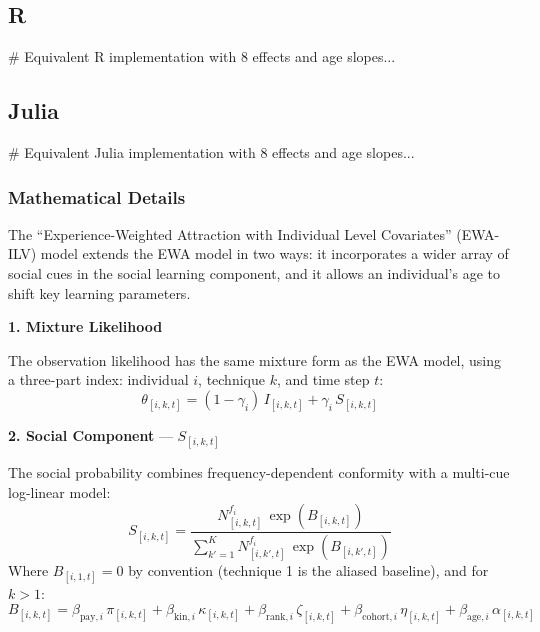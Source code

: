 \documentclass[
  letterpaper,
  DIV=11,
  numbers=noendperiod]{scrartcl}
\newenvironment{Shaded}{\begin{snugshade}}{\end{snugshade}}
\newcommand{\CommentTok}[1]{\textcolor[rgb]{0.37,0.37,0.37}{#1}}
\begin{document}
\subsection{R}

\begin{Shaded}
\begin{Highlighting}[]
\CommentTok{\# Equivalent R implementation with 8 effects and age slopes...}
\end{Highlighting}
\end{Shaded}

\subsection{Julia}

\begin{Shaded}
\begin{Highlighting}[]
\CommentTok{\# Equivalent Julia implementation with 8 effects and age slopes...}
\end{Highlighting}
\end{Shaded}

\subsubsection{Mathematical Details}\label{mathematical-details-1}

The ``Experience-Weighted Attraction with Individual Level Covariates''
(EWA-ILV) model extends the EWA model in two ways: it incorporates a
wider array of social cues in the social learning component, and it
allows an individual's age to shift key learning parameters.

\textbf{1. Mixture Likelihood}

The observation likelihood has the same mixture form as the EWA model,
using a three-part index: individual \(i\), technique \(k\), and time
step \(t\): \[
\theta_{[i,k,t]} = (1 - \gamma_i)\, I_{[i,k,t]} + \gamma_i\, S_{[i,k,t]}
\]

\textbf{2. Social Component} --- \(S_{[i,k,t]}\)

The social probability combines frequency-dependent conformity with a
multi-cue log-linear model: \[
S_{[i,k,t]} = \frac{N_{[i,k,t]}^{f_i}\, \exp(B_{[i,k,t]})}{\sum_{k'=1}^{K} N_{[i,k',t]}^{f_i}\, \exp(B_{[i,k',t]})}
\] Where \(B_{[i,1,t]} = 0\) by convention (technique 1 is the aliased
baseline), and for \(k > 1\): \[
B_{[i,k,t]} = \beta_{\text{pay},i}\, \pi_{[i,k,t]} + \beta_{\text{kin},i}\, \kappa_{[i,k,t]} + \beta_{\text{rank},i}\, \zeta_{[i,k,t]} + \beta_{\text{cohort},i}\, \eta_{[i,k,t]} + \beta_{\text{age},i}\, \alpha_{[i,k,t]}
\]
\end{document}
